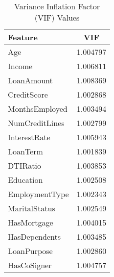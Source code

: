\begin{table}[H]\centering
\caption{Variance Inflation Factor (VIF) Values}
\label{Table 4:vif_values}
\begin{tabular}{lc}
\toprule
Feature & VIF \\
\midrule
Age & 1.004797 \\
Income & 1.006811 \\
LoanAmount & 1.008369 \\
CreditScore & 1.002868 \\
MonthsEmployed & 1.003494 \\
NumCreditLines & 1.002799 \\
InterestRate & 1.005943 \\
LoanTerm & 1.001839 \\
DTIRatio & 1.003853 \\
Education & 1.002508 \\
EmploymentType & 1.002343 \\
MaritalStatus & 1.002549 \\
HasMortgage & 1.004015 \\
HasDependents & 1.003485 \\
LoanPurpose & 1.002860 \\
HasCoSigner & 1.004757 \\
\bottomrule
\end{tabular}
\end{table}
